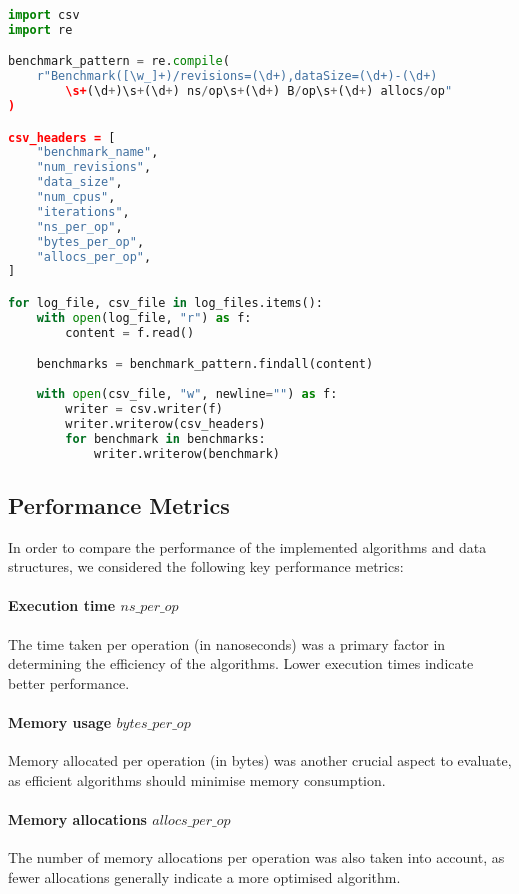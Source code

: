 \begin{lstlisting}[language=python]
import csv
import re

benchmark_pattern = re.compile(
    r"Benchmark([\w_]+)/revisions=(\d+),dataSize=(\d+)-(\d+)
        \s+(\d+)\s+(\d+) ns/op\s+(\d+) B/op\s+(\d+) allocs/op"
)

csv_headers = [
    "benchmark_name",
    "num_revisions",
    "data_size",
    "num_cpus",
    "iterations",
    "ns_per_op",
    "bytes_per_op",
    "allocs_per_op",
]

for log_file, csv_file in log_files.items():
    with open(log_file, "r") as f:
        content = f.read()

    benchmarks = benchmark_pattern.findall(content)
    
    with open(csv_file, "w", newline="") as f:
        writer = csv.writer(f)
        writer.writerow(csv_headers)
        for benchmark in benchmarks:
            writer.writerow(benchmark)

\end{lstlisting}

\subsection*{Performance Metrics}
In order to compare the performance of the implemented algorithms and data structures, we considered the following key performance metrics:

\paragraph{Execution time \(ns\_per\_op\)}
The time taken per operation (in nanoseconds) was a primary factor in determining the efficiency of the algorithms. Lower execution times indicate better performance.

\paragraph{Memory usage \(bytes\_per\_op\)}
Memory allocated per operation (in bytes) was another crucial aspect to evaluate, as efficient algorithms should minimise memory consumption.

\paragraph{Memory allocations \(allocs\_per\_op\)}
The number of memory allocations per operation was also taken into account, as fewer allocations generally indicate a more optimised algorithm.

